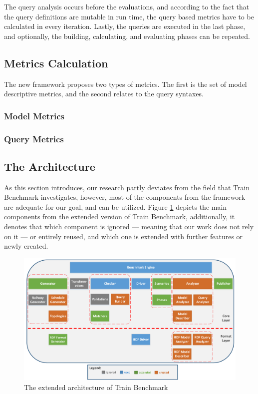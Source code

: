 The query analysis occurs before the evaluations, and according to the fact that the query definitions are mutable in run time, the query based metrics have to be calculated in every iteration. Lastly, the queries are executed in the last phase, and optionally, the building, calculating, and evaluating phases can be repeated.

\subsection{Metrics Calculation}
The new framework proposes two types of metrics. The first is the set of model descriptive metrics, and the second relates to the query syntaxes. 

\subsubsection{Model Metrics}

\subsubsection{Query Metrics}

\subsection{The Architecture}

As this section introduces, our research partly deviates from the field that Train Benchmark investigates, however, most of the components from the framework are adequate for our goal, and can be utilized. Figure \ref{fig:architecture} depicts the main components from the extended version of Train Benchmark, additionally, it denotes that which component is ignored --- meaning that our work does not rely on it --- or entirely reused, and which one is extended with further features or newly created.

\begin{figure}[!ht]
	\centering
	\includegraphics[width=150mm, keepaspectratio]{figures/architecture.pdf}
	\caption{The extended architecture of Train Benchmark }
	\label{fig:architecture}
\end{figure}

